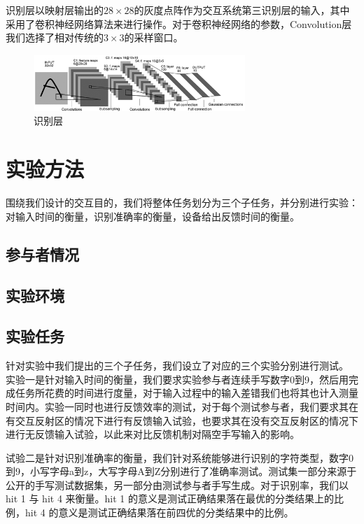 \documentclass[10pt, twocolumn]{article}
\begin{document}
	识别层以映射层输出的$28 \times 28$的灰度点阵作为交互系统第三识别层的输入，其中采用了卷积神经网络算法来进行操作。对于卷积神经网络的参数，Convolution层我们选择了相对传统的$3 \times 3$的采样窗口。


\begin{figure}[htb]
\centering
\begin{minipage}[t]{1\linewidth}
\centering
\includegraphics[width=8cm]{cnn.png}
\caption{识别层}
\label{fig: sample_cnn}
\end{minipage}
\end{figure}



\section{实验方法}
	
	围绕我们设计的交互目的，我们将整体任务划分为三个子任务，并分别进行实验：对输入时间的衡量，识别准确率的衡量，设备给出反馈时间的衡量。
	
	\subsection{参与者情况}
	
	\subsection{实验环境}

	\subsection{实验任务}
	
	针对实验中我们提出的三个子任务，我们设立了对应的三个实验分别进行测试。
	实验一是针对输入时间的衡量，我们要求实验参与者连续手写数字0到9，然后用完成任务所花费的时间进行度量，对于输入过程中的输入差错我们也将其也计入测量时间内。实验一同时也进行反馈效率的测试，对于每个测试参与者，我们要求其在有交互反射区的情况下进行有反馈输入试验，也要求其在没有交互反射区的情况下进行无反馈输入试验，以此来对比反馈机制对隔空手写输入的影响。
	
	试验二是针对识别准确率的衡量，我们针对系统能够进行识别的字符类型，数字0到9，小写字母a到z，大写字母A到Z分别进行了准确率测试。测试集一部分来源于公开的手写测试数据集，另一部分由测试参与者手写生成。对于识别率，我们以hit 1 与 hit 4 来衡量。hit 1 的意义是测试正确结果落在最优的分类结果上的比例，hit 4 的意义是测试正确结果落在前四优的分类结果中的比例。
	
\end{document}
